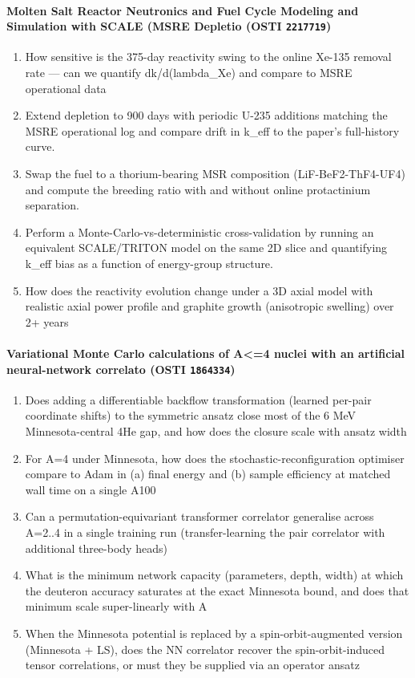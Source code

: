 \paragraph{Molten Salt Reactor Neutronics and Fuel Cycle Modeling and Simulation with SCALE (MSRE Depletio \textnormal{\small(OSTI \texttt{2217719})}}
\begin{enumerate}[leftmargin=1.6em,itemsep=0.2em,topsep=0.2em,label=Q\arabic*.]
\item How sensitive is the 375-day reactivity swing to the online Xe-135 removal rate --- can we quantify dk/d(lambda\_Xe) and compare to MSRE operational data
\item Extend depletion to 900 days with periodic U-235 additions matching the MSRE operational log and compare drift in k\_eff to the paper's full-history curve.
\item Swap the fuel to a thorium-bearing MSR composition (LiF-BeF2-ThF4-UF4) and compute the breeding ratio with and without online protactinium separation.
\item Perform a Monte-Carlo-vs-deterministic cross-validation by running an equivalent SCALE/TRITON model on the same 2D slice and quantifying k\_eff bias as a function of energy-group structure.
\item How does the reactivity evolution change under a 3D axial model with realistic axial power profile and graphite growth (anisotropic swelling) over 2+ years
\end{enumerate}
\paragraph{Variational Monte Carlo calculations of A\textless{}=4 nuclei with an artificial neural-network correlato \textnormal{\small(OSTI \texttt{1864334})}}
\begin{enumerate}[leftmargin=1.6em,itemsep=0.2em,topsep=0.2em,label=Q\arabic*.]
\item Does adding a differentiable backflow transformation (learned per-pair coordinate shifts) to the symmetric ansatz close most of the 6 MeV Minnesota-central 4He gap, and how does the closure scale with ansatz width
\item For A=4 under Minnesota, how does the stochastic-reconfiguration optimiser compare to Adam in (a) final energy and (b) sample efficiency at matched wall time on a single A100
\item Can a permutation-equivariant transformer correlator generalise across A=2..4 in a single training run (transfer-learning the pair correlator with additional three-body heads)
\item What is the minimum network capacity (parameters, depth, width) at which the deuteron accuracy saturates at the exact Minnesota bound, and does that minimum scale super-linearly with A
\item When the Minnesota potential is replaced by a spin-orbit-augmented version (Minnesota + LS), does the NN correlator recover the spin-orbit-induced tensor correlations, or must they be supplied via an operator ansatz
\end{enumerate}
